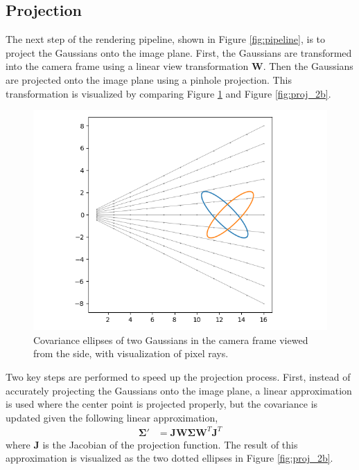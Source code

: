 \subsection{Projection}
\label{sec:projection}
The next step of the rendering pipeline, shown in Figure \ref{fig:pipeline}, is to project the Gaussians onto the image plane.
First, the Gaussians are transformed into the camera frame using a linear view transformation $\bm{W}$.
Then the Gaussians are projected onto the image plane using a pinhole projection.
This transformation is visualized by comparing Figure \ref{fig:proj_2a} and Figure \ref{fig:proj_2b}.


\begin{figure}[t]
    \centering
    \includegraphics[width=\linewidth]{images/proja.png}
    \caption{Covariance ellipses of two Gaussians in the camera frame viewed from the side, with visualization of pixel rays.}
    \label{fig:proj_2a}
\end{figure}


Two key steps are performed to speed up the projection process.
First, instead of accurately projecting the Gaussians onto the image plane, a linear approximation is used where the center point is projected properly, but the covariance is updated given the following linear approximation,
\begin{align}
    \bm{\Sigma'} & = \bm{J} \bm{W} \bm{\Sigma} \bm{W}^T \bm{J}^T \label{eq:linear_approx}
\end{align}
where $\bm{J}$ is the Jacobian of the projection function.
The result of this approximation is visualized as the two dotted ellipses in Figure \ref{fig:proj_2b}.

